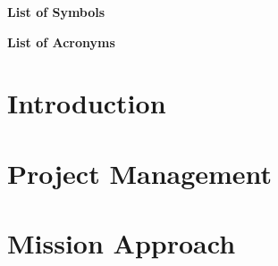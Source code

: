 \documentclass[11pt]{report}
\begin{document}
%
%



%
%



%
%

\newpage
\footnotesize
{}
\tableofcontents
\newpage
{}
\listoffigures
\newpage
{}
\listoftables

%
%

\newpage
{}
\Large{\textbf{List of Symbols}}


%
%

{}
\Large{\textbf{List of Acronyms}}


%
%
\small


%
%

\chapter{Introduction}
\label{chap:intro}


%
%

\chapter{Project Management}
\label{chap:project_management}





%
%

\chapter{Mission Approach}
\label{chap:mission_approach}






\end{document}
